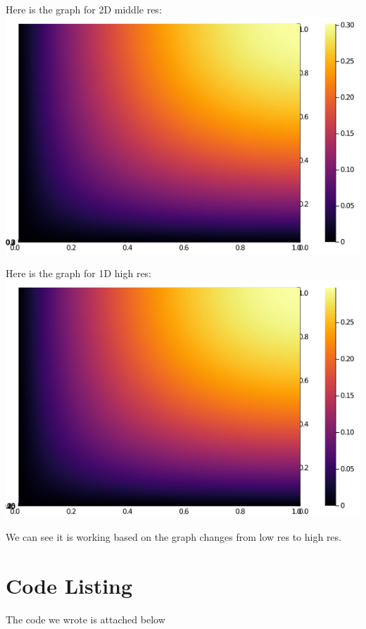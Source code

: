 \documentclass[11pt]{article}
\begin{document}
	Here is the graph for 2D middle res:\\
	\includegraphics[scale=0.5]{2D_mid_res.png}
	
	Here is the graph for 1D high res:\\
	\includegraphics[scale=0.5]{2D_high_res.png}
	
	We can see it is working based on the graph changes from low res to high res.
	
	\section{Code Listing}
	The code we wrote is attached below
	\begin{lstlisting}

	\end{lstlisting}
\end{document}
